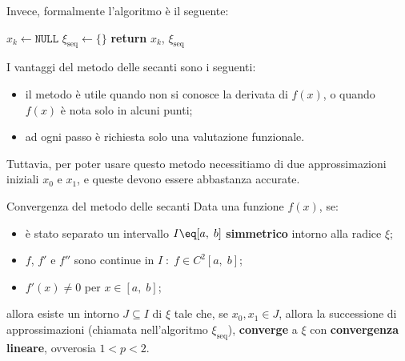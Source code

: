 Invece, formalmente l'algoritmo è il seguente:
\nwl
\begin{algorithm}[H]
    \caption{Metodo delle secanti con estremo variabile}
    $x_k \gets \texttt{NULL}$
    $\xi_{\text{seq}} \gets \{\}$
    \BlankLine
    \textbf{return} $x_k$, $\xi_{\text{seq}}$
\end{algorithm}
\nwl
I vantaggi del metodo delle secanti sono i seguenti:
\begin{itemize}
    \item il metodo è utile quando non si conosce la derivata di $f(x)$, o quando $f(x)$ è nota solo in alcuni punti;
    \item ad ogni passo è richiesta solo una valutazione funzionale.
\end{itemize}

Tuttavia, per poter usare questo metodo necessitiamo di due approssimazioni iniziali $x_0$ e $x_1$, e queste devono essere abbastanza accurate.

\begin{theorem}{Convergenza del metodo delle secanti}
    Data una funzione $f(x)$, se:
    \begin{itemize}
        \item è stato separato un intervallo $I \eq [a, \; b]$ \textbf{simmetrico} intorno alla radice $\xi$;
        \item $f$, $f'$ e $f''$ sono continue in $I \; : \; f \in C^2 [a, \; b]$;
        \item $f'(x) \neq 0$ per $x \in [a, \; b]$;
    \end{itemize}
    allora esiste un intorno $J \subseteq I$ di $\xi$ tale che, se $x_0, x_1 \in J$, allora la successione di approssimazioni (chiamata nell'algoritmo $\xi_{\text{seq}}$), \textbf{converge} a $\xi$ con \textbf{convergenza lineare}, ovverosia $1 < p < 2$.
\end{theorem}